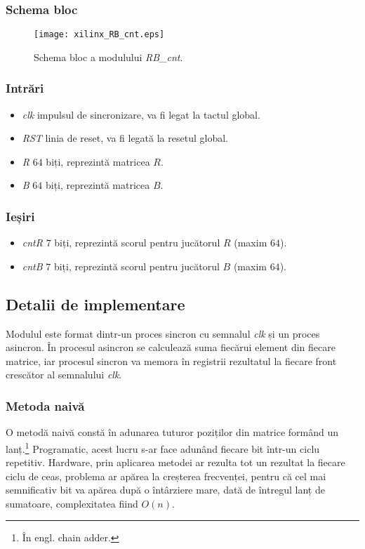 \documentclass[12pt,twoside,a4paper,fleqn]{book}
\theoremstyle{definition}
\begin{document}
\subsubsection{Schema bloc}
\begin{figure}[h]
\texttt{[image: xilinx\_RB\_cnt.eps]}
\caption{\small{Schema bloc a modulului \emph{RB\_cnt}.}}
\label{fig:xilinx_rbcnt}
\end{figure}


\subsubsection{Intrări}
\begin{itemize}
\item \emph{clk} impulsul de sincronizare, va fi legat la tactul global.
\item \emph{RST} linia de reset, va fi legată la resetul global.
\item \emph{R} $64$ biți, reprezintă matricea $R$.
\item \emph{B} $64$ biți, reprezintă matricea $B$. 
\end{itemize}

\subsubsection{Ieșiri}
\begin{itemize}
\item \emph{cntR} $7$ biți, reprezintă scorul pentru jucătorul $R$ (maxim $64$).
\item \emph{cntB} $7$ biți, reprezintă scorul pentru jucătorul $B$ (maxim $64$).
\end{itemize}

\subsection{Detalii de implementare}
Modulul este format dintr-un proces sincron cu semnalul \emph{clk} și un proces asincron. În procesul asincron se calculează suma fiecărui element din fiecare matrice, iar procesul sincron va memora în registrii rezultatul la fiecare front crescător al semnalului \emph{clk}.
\subsubsection{Metoda naivă}
O metodă naivă constă în adunarea tuturor poziților din matrice formând un lanț.\footnote{În engl. chain adder.}  Programatic, acest lucru s-ar face adunând fiecare bit într-un ciclu repetitiv. Hardware, prin aplicarea metodei ar rezulta tot un rezultat la fiecare ciclu de ceas, problema ar apărea la creșterea frecvenței, pentru că cel mai semnificativ bit va apărea după o întârziere mare, dată de întregul lanț de sumatoare, complexitatea fiind $O(n)$.
\end{document}
